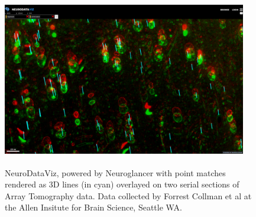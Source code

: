\documentclass[simplex.tex]{subfiles}
\begin{document}
\begin{figure}[!h]
\begin{cframed}
\centering
\includegraphics[width=0.95\textwidth, height = 3in]{../../figs/ndvizpointmatch.png}
\caption{NeuroDataViz, powered by Neuroglancer with point matches rendered as 3D lines (in cyan) overlayed on two serial sections of Array Tomography data. Data collected by Forrest Collman et al at the Allen Insitute for Brain Science, Seattle WA.}
\label{fig:name}
\end{cframed}
\end{figure}

\clearpage
\end{document}
